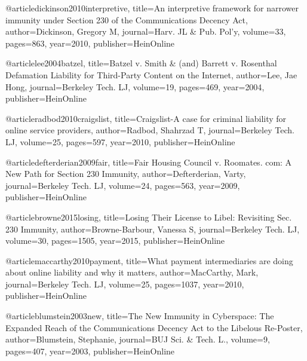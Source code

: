@article{dickinson2010interpretive,
  title={An interpretive framework for narrower immunity under Section 230 of the Communications Decency Act},
  author={Dickinson, Gregory M},
  journal={Harv. JL \& Pub. Pol'y},
  volume={33},
  pages={863},
  year={2010},
  publisher={HeinOnline}
}

@article{lee2004batzel,
  title={Batzel v. Smith \& (and) Barrett v. Rosenthal Defamation Liability for Third-Party Content on the Internet},
  author={Lee, Jae Hong},
  journal={Berkeley Tech. LJ},
  volume={19},
  pages={469},
  year={2004},
  publisher={HeinOnline}
}

@article{radbod2010craigslist,
  title={Craigslist-A case for criminal liability for online service providers},
  author={Radbod, Shahrzad T},
  journal={Berkeley Tech. LJ},
  volume={25},
  pages={597},
  year={2010},
  publisher={HeinOnline}
}

@article{defterderian2009fair,
  title={Fair Housing Council v. Roomates. com: A New Path for Section 230 Immunity},
  author={Defterderian, Varty},
  journal={Berkeley Tech. LJ},
  volume={24},
  pages={563},
  year={2009},
  publisher={HeinOnline}
}

@article{browne2015losing,
  title={Losing Their License to Libel: Revisiting Sec. 230 Immunity},
  author={Browne-Barbour, Vanessa S},
  journal={Berkeley Tech. LJ},
  volume={30},
  pages={1505},
  year={2015},
  publisher={HeinOnline}
}

@article{maccarthy2010payment,
  title={What payment intermediaries are doing about online liability and why it matters},
  author={MacCarthy, Mark},
  journal={Berkeley Tech. LJ},
  volume={25},
  pages={1037},
  year={2010},
  publisher={HeinOnline}
}

@article{blumstein2003new,
  title={The New Immunity in Cyberspace: The Expanded Reach of the Communications Decency Act to the Libelous Re-Poster},
  author={Blumstein, Stephanie},
  journal={BUJ Sci. \& Tech. L.},
  volume={9},
  pages={407},
  year={2003},
  publisher={HeinOnline}
}







